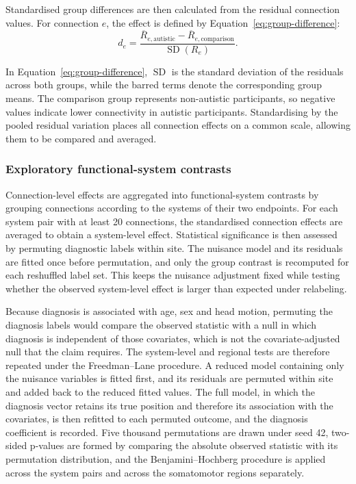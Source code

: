 Standardised group differences are then calculated from the residual connection values.
For connection $e$, the effect is defined by Equation~\eqref{eq:group-difference}:
\begin{equation}
d_e
=
\frac{
\overline{R}_{e,\mathrm{autistic}}
-
\overline{R}_{e,\mathrm{comparison}}
}{
\operatorname{SD}(R_e)
}.
\label{eq:group-difference}
\end{equation}

In Equation~\eqref{eq:group-difference}, $\operatorname{SD}$ is the standard deviation of the residuals across both groups, while the barred terms denote the corresponding group means. The comparison group represents non-autistic participants, so negative values indicate lower connectivity in autistic participants. Standardising by the pooled residual variation places all connection effects on a common scale, allowing them to be compared and averaged.


\subsubsection{Exploratory functional-system contrasts}
\label{subsubsec:system-contrasts}

Connection-level effects are aggregated into functional-system contrasts by grouping connections according to the systems of their two endpoints. For each system pair with at least 20 connections, the standardised connection effects are averaged to obtain a system-level effect. Statistical significance is then assessed by permuting diagnostic labels within site. The nuisance model and its residuals are fitted once before permutation, and only the group contrast is recomputed for each reshuffled label set. This keeps the nuisance adjustment fixed while testing whether the observed system-level effect is larger than expected under relabeling.

Because diagnosis is associated with age, sex and head motion, permuting the diagnosis labels would compare the observed statistic with a null in which diagnosis is independent of those covariates, which is not the covariate-adjusted null that the claim requires. The system-level and regional tests are therefore repeated under the Freedman--Lane procedure. A reduced model containing only the nuisance variables is fitted first, and its residuals are permuted within site and added back to the reduced fitted values. The full model, in which the diagnosis vector retains its true position and therefore its association with the covariates, is then refitted to each permuted outcome, and the diagnosis coefficient is recorded. Five thousand permutations are drawn under seed 42, two-sided p-values are formed by comparing the absolute observed statistic with its permutation distribution, and the Benjamini--Hochberg procedure is applied across the system pairs and across the somatomotor regions separately.


